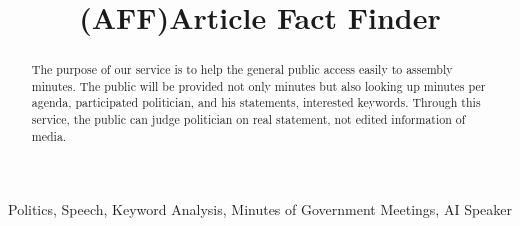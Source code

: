 \documentclass[conference]{IEEEtran}
\begin{document}
\title{(AFF)Article Fact Finder \\
}
\author{
\and
{}
\and
{}
\and
{}
}
\maketitle

\begin{abstract}
The purpose of our service is to help the general public access easily to assembly minutes. The public will be provided not only minutes but also looking up minutes per agenda, participated politician, and his statements, interested keywords. Through this service, the public can judge politician on real statement, not edited information of media.\linebreak \\
\end{abstract}

\begin{IEEEkeywords}
Politics, Speech, Keyword Analysis, Minutes of Government Meetings, AI Speaker  \linebreak \\
\end{IEEEkeywords}
\end{document}
